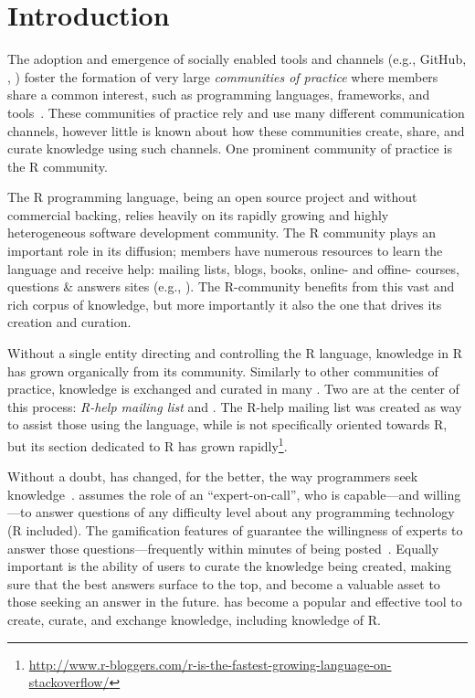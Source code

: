 \section{Introduction}
\label{cha:introduction}
The adoption and emergence of socially enabled tools and channels (e.g., GitHub, \SO, \ml) foster the formation of very large \textit{communities of practice} where members share a common interest, such as programming languages, frameworks, and tools~\cite{Storey2014}. These communities of practice rely and use many different communication channels, however little is known about how these communities create, share, and curate knowledge using such channels. One prominent community of practice is the R community.

The R programming language, being an open source project and without commercial backing, relies heavily on its rapidly growing and highly heterogeneous software development community. The R community plays an important role in its diffusion; members have numerous resources to learn the language and receive help: mailing lists, blogs, books, online- and offine- courses, questions \& answers sites (e.g., \SO). The R-community benefits from this vast and rich corpus of knowledge, but more importantly it also the one that drives its creation and curation.

Without a single entity directing and controlling the R language, knowledge in R has grown organically from its community. Similarly to other communities of practice, knowledge is exchanged and curated in many \channels. Two \channels are at the center of this process: \textit{R-help mailing list} and \textit{\SO}. The R-help mailing list was created as way to assist those using the language, while \SO is not specifically oriented towards R, but its section dedicated to R has grown rapidly\footnote{\href{http://www.r-bloggers.com/r-is-the-fastest-growing-language-on-stackoverflow/}{http://www.r-bloggers.com/r-is-the-fastest-growing-language-on-stackoverflow/}}.

Without a doubt, \SO has changed, for the better, the way programmers seek knowledge~\cn. \SO assumes the role of an ``expert-on-call'', who is capable---and willing---to answer questions of any difficulty level about any programming technology (R included). The gamification features of \SO guarantee the willingness of experts to answer those questions---frequently within minutes of being posted~\cn{}. Equally important is the ability of \SO users to curate the knowledge being created, making sure that the best answers surface to the top, and become a valuable asset to those seeking an answer in the future. \SO has become a popular and effective tool to create, curate, and exchange knowledge, including knowledge of R.

